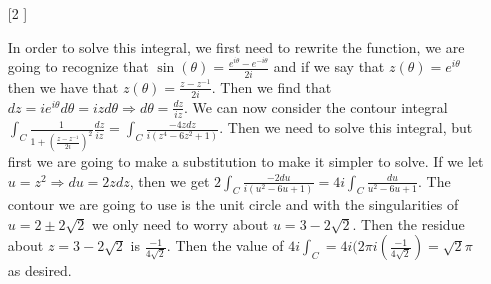 \documentclass{article}
\theoremstyle{definition}
\begin{document}
\begin{enumerate}
    \item [[\phantom{-}2]]
    
    In order to solve this integral, we first need to rewrite the function, we are going to recognize that $\sin(\theta) = \frac{e^{i\theta} - e^{-i\theta}}{2i}$ and if we say that $z(\theta) = e^{i\theta}$ then we have that $z(\theta) = \frac{z - z^{-1}}{2i}$. Then we find that $dz = ie^{i\theta}d\theta = izd\theta \Rightarrow d\theta = \frac{dz}{iz}$. We can now consider the contour integral $\int_C\frac{1}{1 + (\frac{z - z^{-1}}{2i})^2}\frac{dz}{iz} = \int_C\frac{-4zdz}{i(z^4 - 6z^2+ 1)}$. Then we need to solve this integral, but first we are going to make a substitution to make it simpler to solve. If we let $u = z^2 \Rightarrow du = 2zdz$, then we get $2\int_C\frac{-2du}{i(u^2 - 6u + 1)} = 4i\int_C\frac{du}{u^2 - 6u + 1}$. The contour we are going to use is the unit circle and with the singularities of $u = 2\pm 2\sqrt{2}$ we only need to worry about $u = 3 - 2\sqrt{2}$. Then the residue about $z = 3 - 2\sqrt{2}$ is $\frac{-1}{4\sqrt{2}}$. Then the value of $4i\int_C = 4i(2\pi i (\frac{-1}{4\sqrt{2}}) = \sqrt{2}\pi$ as desired.
    
\end{enumerate}
\end{document}

